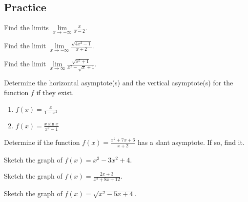 \subsection{Practice}

\begin{exercise}

Find the limits \(\lim\limits_{x\to -\infty}\frac{x}{x - 2}\).

\end{exercise}
\vspace*{6\baselineskip}

\begin{exercise}

Find the limit \(\lim\limits_{x\to -\infty}\frac{\sqrt{4x^2 - 1}}{x+2}\).

\end{exercise}
\vspace*{6\baselineskip}

\begin{exercise}

Find the limit
\(\lim\limits_{x\to \infty}\frac{\sqrt{x^5+1}}{x^2 - \sqrt{x}+1}\).

\end{exercise}
\vspace*{6\baselineskip}

\begin{exercise}

Determine the horizontal asymptote(s) and the vertical asymptote(s) for
the function \(f\) if they exist.

\begin{enumerate}
\item
  \(f(x)=\frac{x}{1 - x^2}\)
\item
  \(f(x)=\frac{x\sin x}{x^2 - 1}\)
\end{enumerate}

\end{exercise}

\begin{exercise}

Determine if the function \(f(x)=\frac{x^2+7x+6}{x+2}\) has a slant
asymptote. If so, find it.

\end{exercise}
\vspace*{6\baselineskip}

\begin{exercise}

Sketch the graph of \(f(x)=x^3 - 3x^2+4\).

\end{exercise}
\vspace*{10\baselineskip}

\begin{exercise}

Sketch the graph of \(f(x)=\frac{2x+3}{x^{2}+8x+12}\).

\end{exercise}
\vspace*{10\baselineskip}

\begin{exercise}

Sketch the graph of \(f(x)=\sqrt{x^2 - 5x+4}\).

\end{exercise}

